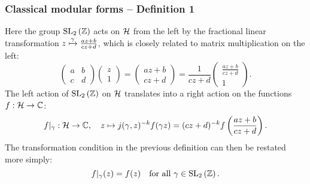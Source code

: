 \begin{frame} \frametitle{Classical modular forms -- Definition 1}
  Here the group $\SL[2]{\ZZ}$ acts on $\HH$ from the left by the fractional linear transformation $z \xmapsto{\gamma} \frac{az+b}{cz+d}$, which is closely related to matrix multiplication on the left:
  \[ \begin{pmatrix} a & b \\ c & d \end{pmatrix} \begin{pmatrix} z \\ 1 \end{pmatrix} = \begin{pmatrix} az+b \\ cz+d \end{pmatrix} = \frac{1}{cz+d} \begin{pmatrix} \frac{az+b}{cz+d} \\ 1 \end{pmatrix}. \]
  \pause
  The left action of $\SL[2]{\ZZ}$ on $\HH$ translates into a right action on the functions $f : \HH \to \CC$:
  \[ f|_\gamma : \HH \to \CC, \quad z \mapsto j(\gamma,z)^{-k} f(\gamma z) = (cz+d)^{-k} f\parens{\frac{az+b}{cz+d}}. \]
  \pause
  The transformation condition in the previous definition can then be restated more simply: \pause
  \[ f|_\gamma(z) = f(z) \lsptext{for all} \gamma \in \SL[2]{\ZZ}. \]
\end{frame}



